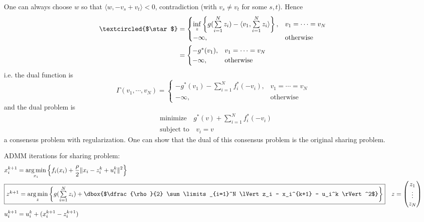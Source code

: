 One can always choose $w$ so that $\langle w, -v_s+v_t \rangle < 0$, contradiction (with $v_s\neq v_t$ for some $s, t$). Hence
\begin{align*}
    \textcircled{$\star$} & = \begin{cases}
    \inf\limits_{z} \left\{ g(\sum\limits_{i=1}^N z_i) - \langle v_1, \sum\limits_{i=1}^N z_i \rangle \right\}, & v_1 = \cdots = v_N \\
    -\infty, & \text{otherwise}
    \end{cases} \\
    & = \begin{cases}
    -g^*(v_1), & v_1 = \cdots = v_N \\
    -\infty, & \text{otherwise}
    \end{cases}
\end{align*}
i.e. the dual function is
$$
\Gamma(v_1,\cdots,v_N) = \begin{cases}
    -g^*(v_1) - \sum\limits_{i=1}^N f_i^*(-v_i), & v_1 = \cdots = v_N \\
    -\infty, & \text{otherwise}
    \end{cases}
$$
and the dual problem is
\begin{align*}
    & \text{minimize} \quad g^*(v) + \sum\limits_{i=1}^N f_i^*(-v_i) \\
    & \text{subject to} \quad v_i = v
\end{align*}
a consensus problem with regularization. One can show that the dual of this consensus problem is the original sharing problem.

ADMM iterations for sharing problem:
\begin{align*}
    & x_i^{k+1} = \argmin_{x_i} \left\{ f_i(x_i) + \dfrac{\rho}{2} \lVert x_i - z_i^k + u_i^k \rVert^2 \right\} \\
    & \framebox{$z^{k+1} = \argmin\limits_z \left\{ g(\sum\limits_{i=1}^N z_i) + \dbox{$\dfrac{\rho}{2} \sum\limits_{i=1}^N \lVert z_i - x_i^{k+1} - u_i^k \rVert^2$} \right\}$} \tikz[overlay, remember picture]{\node[] (sharing_z) {}} \quad z = \begin{pmatrix} z_1 \\ \vdots \\ z_N \end{pmatrix} \\
    & u_i^{k+1} = u_i^k + (x_i^{k+1}-z_i^{k+1})
\end{align*}

